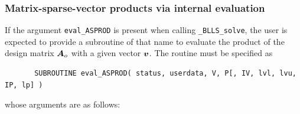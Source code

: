 \documentclass{galahad}
\newcommand{\packagename}{BLLS}
\newcommand{\fullpackagename}{\libraryname\_\packagename}
\newcommand{\solver}{{\tt \fullpackagename\_solve}}
\begin{document}

\subsubsection{Matrix-sparse-vector products via internal evaluation\label{jvps}}

If the argument {\tt eval\_ASPROD} is present when calling \solver, the
user is expected to provide a subroutine of that name to evaluate the
product of the design matrix ${\bm{A}}_o$ with a given vector ${\bm{v}}$.
The routine must be specified as

\def\baselinestretch{0.8}
{\tt \begin{verbatim}
       SUBROUTINE eval_ASPROD( status, userdata, V, P[, IV, lvl, lvu, IP, lp] )
\end{verbatim} }
\def\baselinestretch{1.0}
\noindent whose arguments are as follows:
\end{document}
